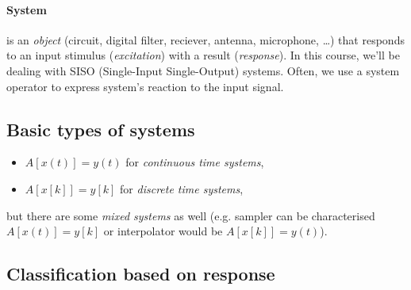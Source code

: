 \documentclass[11pt,a4paper]{report}
\theoremstyle{remark}
\theoremstyle{definition}
\begin{document}
			\paragraph{System} is an \textit{object} (circuit, digital filter, reciever, antenna, microphone, \dots) that responds to an input stimulus (\textit{excitation}) with a result (\textit{response}). In this course, we'll be dealing with SISO (Single-Input Single-Output) systems.
			Often, we use a system operator to express system's reaction to the input signal.
			
			\subsection{Basic types of systems}
			
				\begin{itemize}
					\item $A[x(t)] = y(t)$ for \textit{continuous time systems},
					\item $A[x[k]] = y[k]$ for \textit{discrete time systems},
				\end{itemize}
				but there are some \textit{mixed systems} as well (e.g. sampler can be characterised $A[x(t)] = y[k]$ or interpolator would be $A[x[k]] = y(t)$).
				
			\subsection{Classification based on response}
				
\end{document}

